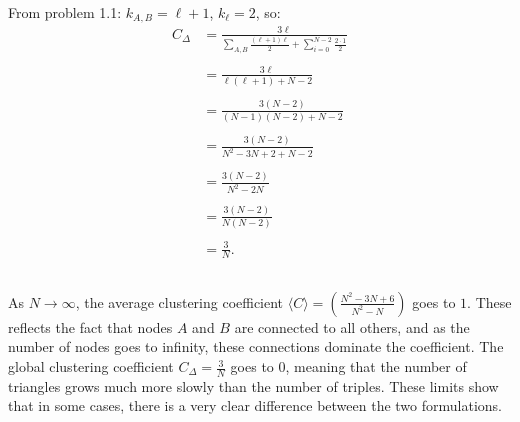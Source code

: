 \documentclass {article}
\begin{document}
From problem 1.1: $ k_{A, B} = \ell + 1$,    $k_{\ell} = 2 $, so:
\begin{align*}
 C_{\Delta} &=   \frac{ 3 \ell }{ \sum\limits_{ A,B} \frac{ (\ell + 1) \ell }{ 2 } + \sum\limits_{ i=0 }^{N-2} \frac{ 2 \cdot 1 }{ 2 }} \\ \\
& =\frac{ 3 \ell }{ \ell (\ell + 1) + N - 2 } \\ \\
& = \frac{ 3 (N - 2) }{ (N-1)(N-2) + N - 2 } \\ \\
& = \frac{ 3 (N - 2) }{ N^2 - 3N + 2 + N - 2 } \\ \\
& = \frac{ 3 (N - 2) }{ N^2 - 2N } \\ \\
& = \frac{ 3 (N - 2) }{ N (N - 2) } \\ \\
& = \frac{ 3 }{ N }.
\end{align*}


\subsection{}
As $ N \to \infty $, the average clustering coefficient $ \langle C \rangle = (\frac{ N^2 - 3N + 6 }{ N^2 - N }) $ goes to $ 1 $. These reflects the fact that nodes $ A $ and $ B $ are connected to all others, and as the number of nodes goes to infinity, these connections dominate the coefficient. The global clustering coefficient $ C_{\Delta} = \frac{ 3 }{ N } $ goes to 0, meaning that the number of triangles grows much more slowly than the number of triples. These limits show that in some cases, there is a very clear difference between the two formulations. 

\newpage
\end{document}
